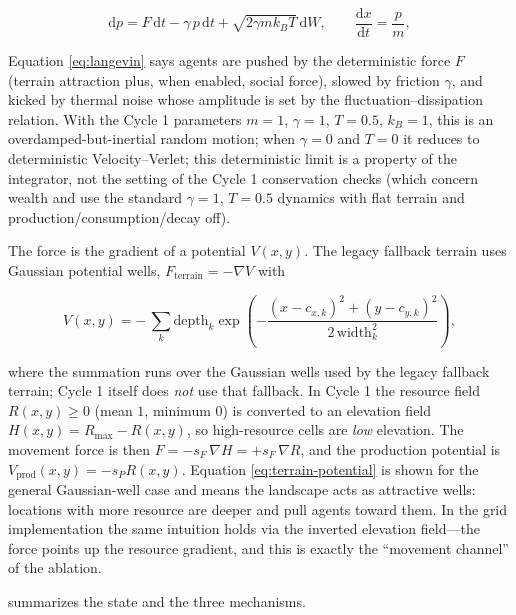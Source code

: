 \documentclass[11pt,a4paper]{article}
\begin{document}
\begin{equation}
\mathrm{d}p = F\,\mathrm{d}t - \gamma\,p\,\mathrm{d}t + \sqrt{2\gamma m k_B T}\,\mathrm{d}W,
\qquad
\frac{\mathrm{d}x}{\mathrm{d}t} = \frac{p}{m},
\label{eq:langevin}
\end{equation}

Equation \eqref{eq:langevin} says agents are pushed by the deterministic force
$F$ (terrain attraction plus, when enabled, social force), slowed by friction
$\gamma$, and kicked by thermal noise whose amplitude is set by the
fluctuation--dissipation relation. With the Cycle 1 parameters $m=1$,
$\gamma=1$, $T=0.5$, $k_B=1$, this is an overdamped-but-inertial random motion;
when $\gamma=0$ and $T=0$ it reduces to deterministic Velocity--Verlet; this
deterministic limit is a property of the integrator, not the setting of the
Cycle 1 conservation checks (which concern wealth and use the standard
$\gamma=1$, $T=0.5$ dynamics with flat terrain and production/consumption/decay
off).

The force is the gradient of a potential $V(x,y)$. The legacy fallback terrain
uses Gaussian potential wells, $F_{\mathrm{terrain}}=-\nabla V$ with

\begin{equation}
V(x,y) = -\,\sum_k \mathrm{depth}_k \exp\!\left(-\frac{(x-c_{x,k})^2+(y-c_{y,k})^2}{2\,\mathrm{width}_k^2}\right),
\label{eq:terrain-potential}
\end{equation}

where the summation runs over the Gaussian wells used by the legacy fallback
terrain; Cycle 1 itself does \emph{not} use that fallback. In Cycle 1 the
resource field $R(x,y)\ge0$ (mean $1$, minimum $0$) is converted to an
elevation field $H(x,y)=R_{\max}-R(x,y)$, so high-resource cells are
\emph{low} elevation. The movement force is then
$F=-s_F\,\nabla H=+s_F\,\nabla R$, and the production potential is
$V_{\mathrm{prod}}(x,y)=-s_P R(x,y)$.
Equation \eqref{eq:terrain-potential} is shown for the general Gaussian-well
case and means the landscape acts as attractive wells: locations with more
resource are deeper and pull agents toward them. In the grid implementation the
same intuition holds via the inverted elevation field---the force points up the
resource gradient, and this is exactly the ``movement channel'' of the
ablation.

 summarizes the state and the three mechanisms.
\end{document}
